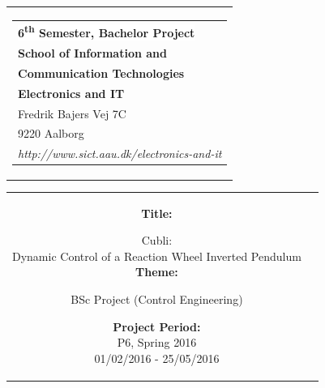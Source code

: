 % 
\begin{nopagebreak}
{\samepage 

\begin{tabular}{r}
\parbox{\textwidth}{  
\hfill \hspace{2cm} \parbox{8cm}{\begin{tabular}{l} %
{\small \textbf{\textcolor{aaublue}{\colorbox{white}{6\textsuperscript{th} Semester, Bachelor Project}}}}\\
{\small \textbf{\textcolor{aaublue}{School of Information and}}}\\
{\small \textbf{\textcolor{aaublue}{Communication Technologies}}}\\ 
{\small \textbf{\textcolor{aaublue}{Electronics and IT}}}\\
{\small \textcolor{aaublue}{Fredrik Bajers Vej 7C}} \\
{\small \textcolor{aaublue}{9220 Aalborg}} \\
{\small \textcolor{aaublue}{\emph{http://www.sict.aau.dk/electronics-and-it}}}
\end{tabular}}}
\end{tabular}

\begin{tabular}{cc}
\parbox{7cm}{

\textbf{Title:}

Cubli:\\
Dynamic Control of a Reaction Wheel Inverted Pendulum\\ %

\textbf{Theme:}

\small{
BSc Project (Control Engineering)\\
}


\parbox{8cm}{


\textbf{Project Period:}\\
P6, Spring 2016\\
01/02/2016 - 25/05/2016\\
   
}}
\end{tabular}}
\end{nopagebreak}
